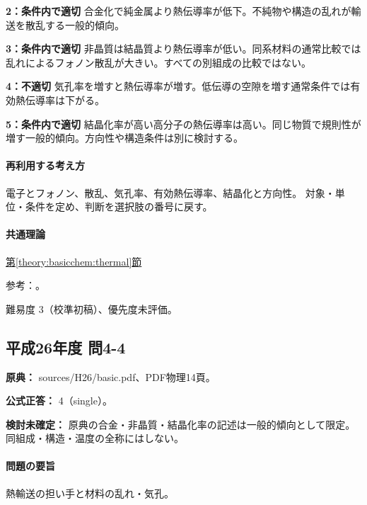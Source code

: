 \noindent\textbf{2：条件内で適切} 合金化で純金属より熱伝導率が低下。不純物や構造の乱れが輸送を散乱する一般的傾向。\par

\noindent\textbf{3：条件内で適切} 非晶質は結晶質より熱伝導率が低い。同系材料の通常比較では乱れによるフォノン散乱が大きい。すべての別組成の比較ではない。\par

\noindent\textbf{4：不適切} 気孔率を増すと熱伝導率が増す。低伝導の空隙を増す通常条件では有効熱伝導率は下がる。\par

\noindent\textbf{5：条件内で適切} 結晶化率が高い高分子の熱伝導率は高い。同じ物質で規則性が増す一般的傾向。方向性や構造条件は別に検討する。\par

\paragraph{再利用する考え方} 電子とフォノン、散乱、気孔率、有効熱伝導率、結晶化と方向性。 対象・単位・条件を定め、判断を選択肢の番号に戻す。

\paragraph{共通理論} \hyperref[theory:basicchem:thermal]{第\ref*{theory:basicchem:thermal}節}

\par 参考：\cite{aist_metal_thermal,openstax_thermal_conduction,chem55_polymer}。

\par 難易度 3（校準初稿）、優先度未評価。

\subsection{平成26年度 問4-4}
\label{q:h26-reg-basic-4-4}

\noindent\textbf{原典：} sources/H26/basic.pdf、PDF物理14頁。

\textbf{公式正答：} 4（single）。

\par\textbf{検討未確定：} 原典の合金・非晶質・結晶化率の記述は一般的傾向として限定。同組成・構造・温度の全称にはしない。

\paragraph{問題の要旨} 熱輸送の担い手と材料の乱れ・気孔。

